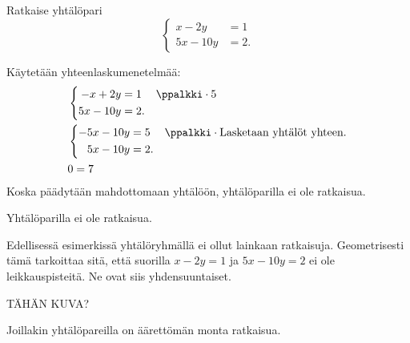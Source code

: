 \begin{esimerkki}
Ratkaise yhtälöpari
\[
\left\{
\begin{aligned}
x-2y&= 1 \\
5x-10y&= 2.
\end{aligned}
\right.
\]
\begin{esimratk}
Käytetään yhteenlaskumenetelmää:
\begin{align*}
&\left\{
\begin{aligned}
-x+2y&= 1 && \ppalkki \cdot 5 \\
5x-10y&= 2. &&
\end{aligned}
\right. \\
&\left\{
\begin{aligned}
-5x-10y&= 5 && \ppalkki \cdot \text{Lasketaan yhtälöt yhteen.} \\
5x-10y&= 2. &&
\end{aligned}
\right. \\
&0=7 \\
\end{align*}
Koska päädytään mahdottomaan yhtälöön, yhtälöparilla ei ole ratkaisua.
\end{esimratk}
\begin{esimvast}
Yhtälöparilla ei ole ratkaisua.
\end{esimvast}
\end{esimerkki}

Edellisessä esimerkissä yhtälöryhmällä ei ollut lainkaan ratkaisuja. Geometrisesti tämä tarkoittaa sitä, että suorilla $x-2y= 1$ ja $5x-10y= 2$ ei ole leikkauspisteitä. Ne ovat siis yhdensuuntaiset.

TÄHÄN KUVA?

Joillakin yhtälöpareilla on äärettömän monta ratkaisua.

